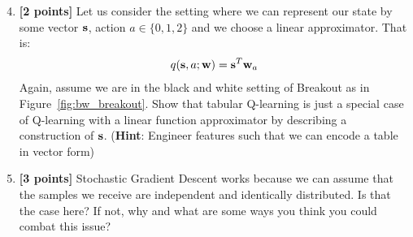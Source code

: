 \begin{enumerate}
\setcounter{enumi}{3}
\item \textbf{[2 points]} Let us consider the setting where we can represent our state by some vector $\mathbf{s}$, action $a \in \{0, 1, 2\}$ and we choose a linear approximator. That is:
\begin{align}
q(\mathbf{s}, a; \mathbf{w}) = \mathbf{s}^T\mathbf{w}_a
\end{align}
Again, assume we are in the black and white setting of Breakout as in Figure~\ref{fig:bw_breakout}. Show that tabular Q-learning is just a special case of Q-learning with a linear function approximator by describing a construction of $\mathbf{s}$. (\textbf{Hint}: Engineer features such that we can encode a table in vector form)

\begin{tcolorbox}[fit,height=4cm, width=\linewidth, blank, borderline={1pt}{-2pt},nobeforeafter]
\end{tcolorbox}


\item \textbf{[3 points]} Stochastic Gradient Descent works because we can assume that the samples we receive are independent and identically distributed. Is that the case here? If not, why and what are some ways you think you could combat this issue?

\begin{tcolorbox}[fit,height=3cm, width=\linewidth, blank, borderline={1pt}{-2pt},nobeforeafter]
\end{tcolorbox}





\end{enumerate}

